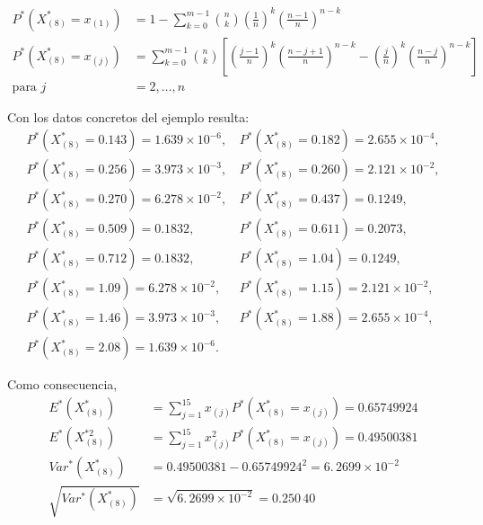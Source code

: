 \documentclass[]{book}
\theoremstyle{definition}
\theoremstyle{definition}
\theoremstyle{definition}
\theoremstyle{remark}
\begin{document}
\[\begin{aligned}
P^{\ast}\left( X_{\left( 8 \right)}^{\ast}=x_{(1)} \right)
&= 1-\sum_{k=0}^{m-1}\binom{n}{k}\left( \frac{1}{n} \right)^{k}\left( \frac{
n-1}{n} \right)^{n-k} \\
P^{\ast}\left( X_{\left( 8 \right)}^{\ast}=x_{(j)} \right)
&= \sum_{k=0}^{m-1}\binom{n}{k}\left[ \left( \frac{j-1}{n} \right)^{k}\left( 
\frac{n-j+1}{n} \right)^{n-k} - \left( \frac{j}{n} \right)^{k}\left( \frac{n-j}{n} \right)^{n-k}
\right] \\
\text{para }j &= 2,\ldots ,n
\end{aligned}\]

Con los datos concretos del ejemplo resulta: \[\begin{array}{ll}
P^{\ast}\left( X_{\left( 8 \right)}^{\ast} = 0.143 \right) = 1.639\times 10^{-6}\text{, } 
& P^{\ast}\left( X_{\left( 8 \right)}^{\ast} = 0.182 \right) = 2.655\times 10^{-4},\\
P^{\ast}\left( X_{\left( 8 \right)}^{\ast} = 0.256 \right) = 3.973\times 10^{-3}\text{, } 
& P^{\ast}\left( X_{\left( 8 \right)}^{\ast} = 0.260 \right) = 2.121\times 10^{-2}, \\
P^{\ast}\left( X_{\left( 8 \right)}^{\ast} = 0.270 \right) = 6.278\times 10^{-2}\text{, }
& P^{\ast}\left( X_{\left( 8 \right)}^{\ast} = 0.437 \right) = 0.1249, \\
P^{\ast}\left( X_{\left( 8 \right)}^{\ast} = 0.509 \right) = 0.1832\text{, }
& P^{\ast}\left( X_{\left( 8 \right)}^{\ast} = 0.611 \right) = 0.2073,\\
P^{\ast}\left( X_{\left( 8 \right)}^{\ast} = 0.712 \right) = 0.1832\text{, }
& P^{\ast}\left( X_{\left( 8 \right)}^{\ast} = 1.04 \right) = 0.1249,\\
P^{\ast}\left( X_{\left( 8 \right)}^{\ast} = 1.09 \right) = 6.278\times 10^{-2}\text{, }
& P^{\ast}\left( X_{\left( 8 \right)}^{\ast} = 1.15 \right) = 2.121\times 10^{-2}, \\
P^{\ast}\left( X_{\left( 8 \right)}^{\ast} = 1.46 \right) = 3.973\times 10^{-3}\text{, }
& P^{\ast}\left( X_{\left( 8 \right)}^{\ast} = 1.88 \right) = 2.655\times 10^{-4}, \\
P^{\ast}\left( X_{\left( 8 \right)}^{\ast} = 2.08 \right) = 1.639\times 10^{-6}. 
\end{array}\]

Como consecuencia, \[\begin{aligned}
E^{\ast}\left( X_{\left( 8 \right)}^{\ast} \right)
&= \sum_{j=1}^{15}x_{(j)}P^{\ast}\left( X_{\left( 8 \right)
}^{\ast}=x_{(j)} \right) =0.65749924 \\
E^{\ast}\left( X_{\left( 8 \right)}^{\ast 2} \right)
&= \sum_{j=1}^{15}x_{(j)}^2P^{\ast}\left( X_{\left( 8 \right)
}^{\ast}=x_{(j)} \right) =0.49500381 \\
Var^{\ast}\left( X_{\left( 8 \right)}^{\ast} \right)
&= 0.49500381-0.65749924^2=6.\, 2699\times 10^{-2} \\
\sqrt{Var^{\ast}\left( X_{\left( 8 \right)}^{\ast} \right)} &= \sqrt{
6.\, 2699\times 10^{-2}}=0.250\,40
\end{aligned}\]
\end{document}
